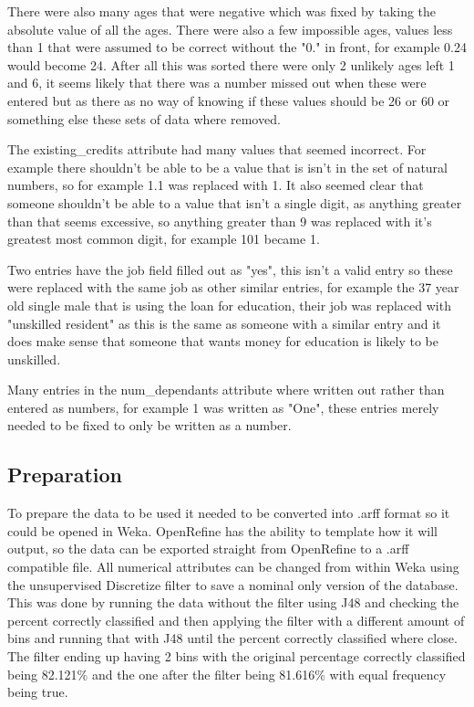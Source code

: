 \documentclass[12pt, a4paper]{article}
\begin{document}
	There were also many ages that were negative which was fixed by taking the absolute value of all the ages. There were also a few impossible ages, values less than 1 that were assumed to be correct without the "0." in front, for example 0.24 would become 24. After all this was sorted there were only 2 unlikely ages left 1 and 6, it seems likely that there was a number missed out when these were entered but as there as no way of knowing if these values should be 26 or 60 or something else these sets of data where removed.
	
	The existing\_credits attribute had many values that seemed incorrect. For example there shouldn't be able to be a value that is isn't in the set of natural numbers, so for example 1.1 was replaced with 1. It also seemed clear that someone shouldn't be able to a value that isn't a single digit, as anything greater than that seems excessive, so anything greater than 9 was replaced with it's greatest most common digit, for example 101 became 1.
	
	Two entries have the job field filled out as "yes", this isn't a valid entry so these were replaced with the same job as other similar entries, for example the 37 year old single male that is using the loan for education, their job was replaced with "unskilled resident" as this is the same as someone with a similar entry and it does make sense that someone that wants money for education is likely to be unskilled.
	
	Many entries in the num\_dependants attribute where written out rather than entered as numbers, for example 1 was written as "One", these entries merely needed to be fixed to only be written as a number.
	
	\subsection{Preparation}
	To prepare the data to be used it needed to be converted into .arff format so it could be opened in Weka. OpenRefine has the ability to template how it will output, so the data can be exported straight from OpenRefine to a .arff compatible file. All numerical attributes can be changed from within Weka using the unsupervised Discretize filter to save a nominal only version of the database. This was done by running the data without the filter using J48 and checking the percent correctly classified and then applying the filter with a different amount of bins and running that with J48 until the percent correctly classified where close. The filter ending up having 2 bins with the original percentage correctly classified being 82.121\% and the one after the filter being 81.616\% with equal frequency being true.
	
\end{document}
